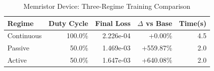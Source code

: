 \begin{table}[htbp]
\centering
\caption{Memristor Device: Three-Regime Training Comparison}
\label{tab:memristor_regimes}
\begin{tabular}{lrrrr}
\hline
Regime & Duty Cycle & Final Loss & $\Delta$ vs Base & Time(s) \\
\hline
Continuous & 100.0\% & 2.226e-04 & +0.00\% & 4.5 \\
Passive & 50.0\% & 1.469e-03 & +559.87\% & 2.0 \\
Active & 50.0\% & 1.647e-03 & +640.08\% & 2.0 \\
\hline
\end{tabular}
\end{table}
